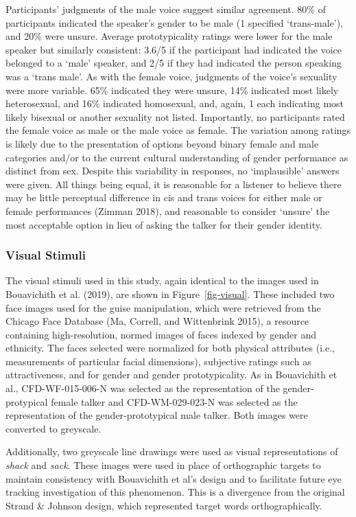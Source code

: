 \documentclass[
  letterpaper,
  DIV=11,
  numbers=noendperiod]{scrartcl}
\begin{document}
Participants' judgments of the male voice suggest similar agreement.
80\% of participants indicated the speaker's gender to be male (1
specified `trans-male'), and 20\% were unsure. Average prototypicality
ratings were lower for the male speaker but similarly consistent: 3.6/5
if the participant had indicated the voice belonged to a `male' speaker,
and 2/5 if they had indicated the person speaking was a `trans male'. As
with the female voice, judgments of the voice's sexuality were more
variable. 65\% indicated they were unsure, 14\% indicated most likely
heterosexual, and 16\% indicated homosexual, and, again, 1 each
indicating most likely bisexual or another sexuality not listed.
Importantly, no participants rated the female voice as male or the male
voice as female. The variation among ratings is likely due to the
presentation of options beyond binary female and male categories and/or
to the current cultural understanding of gender performance as distinct
from sex. Despite this variability in responses, no `implausible'
answers were given. All things being equal, it is reasonable for a
listener to believe there may be little perceptual difference in cis and
trans voices for either male or female performances (Zimman 2018), and
reasonable to consider `unsure' the most acceptable option in lieu of
asking the talker for their gender identity.

\subsubsection{Visual Stimuli}\label{sec-stimuli-visual}

The visual stimuli used in this study, again identical to the images
used in Bouavichith et al. (2019), are shown in Figure~\ref{fig-visual}.
These included two face images used for the guise manipulation, which
were retrieved from the Chicago Face Database (Ma, Correll, and
Wittenbrink 2015), a resource containing high-resolution, normed images
of faces indexed by gender and ethnicity. The faces selected were
normalized for both physical attributes (i.e., measurements of
particular facial dimensions), subjective ratings such as
attractiveness, and for gender and gender prototypicality. As in
Bouavichith et al., CFD-WF-015-006-N was selected as the representation
of the gender-protypical female talker and CFD-WM-029-023-N was selected
as the representation of the gender-prototypical male talker. Both
images were converted to greyscale.

Additionally, two greyscale line drawings were used as visual
representations of \emph{shack} and \emph{sack}. These images were used
in place of orthographic targets to maintain consistency with
Bouavichith et al's design and to facilitate future eye tracking
investigation of this phenomenon. This is a divergence from the original
Strand \& Johnson design, which represented target words
orthographically.
\end{document}
